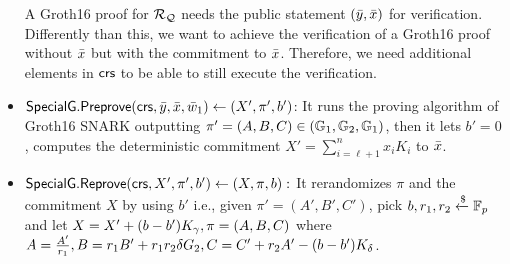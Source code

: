 \begin{itemize}
A Groth16 proof for $ \mathcal{R}_{\mathcal{Q}} $ needs the public statement $ (\bar{y},\bar{x})$ for verification. Differently than this, we want to achieve the verification of a Groth16 proof without $ \bar{x} $ but with the commitment to $ \bar{x} $. Therefore, we need additional elements in $ \mathsf{crs} $ to be able to still execute the verification.
\item ${\mathsf{SpecialG}}.{\mathsf{Preprove}}(\mathsf{crs}, \bar{y}, \bar{x}, \bar{w}_1) \leftarrow (X', \pi', b')$: It runs the proving algorithm of Groth16 SNARK outputting $ \pi' = (A, B, C)  \in (\mathbb{G}_1, \mathbb{G}_2, \mathbb{G}_1)$, then it lets $ b' = 0 $, computes the deterministic commitment $ X' = \sum_{i = \ell +1}^n x_i K_i$ to  $ \bar{x} $.
\item${\mathsf{SpecialG}}.{\mathsf{Reprove}}(\mathsf{crs}, X', \pi', b') \leftarrow (X, \pi, b):$ It rerandomizes $ \pi $ and the commitment $ X $  by using $ b' $ i.e., given $ \pi' = (A',B',C') $, pick $ b , r_1, r_2  \xleftarrow{\$} \mathbb{F}_p $ and let $ X = X' + (b- b') K_{\gamma}, \pi = (A, B, C)  $ where $ A = \frac{A'}{r_1}, B = r_1 B' + r_1r_2 \delta {G}_2, C = C' + r_2A'  - (b - b') K_{\delta} $.



\end{itemize}
